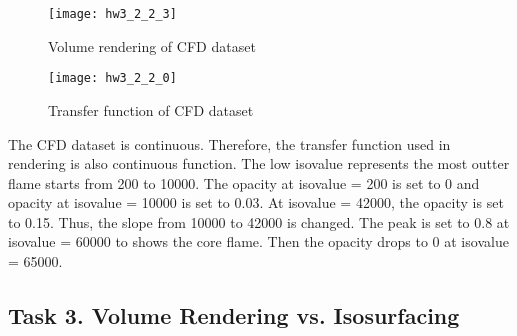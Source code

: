 \documentclass[11pt]{article}
\begin{document}
\begin{figure}[H]
\centering
\texttt{[image: hw3\_2\_2\_3]}
\caption{Volume rendering of CFD dataset}
\label{fig:hw3_2_2_3}
\end{figure}

\begin{figure}[H]
\centering
\texttt{[image: hw3\_2\_2\_0]}
\caption{Transfer function of CFD dataset}
\label{fig:hw3_2_2_0}
\end{figure}

The CFD dataset is continuous. Therefore, the transfer function used in rendering is also continuous function. The low isovalue represents the most outter flame starts from 200 to 10000.
The opacity at isovalue = 200 is set to 0 and opacity at isovalue = 10000 is set to 0.03. At isovalue  = 42000, the opacity is set to 0.15. Thus, the slope from 10000 to 42000 is changed.
The peak is set to 0.8 at isovalue = 60000 to shows the core flame. Then the opacity drops to 0 at isovalue = 65000.

\subsection*{Task 3. Volume Rendering vs. Isosurfacing}
\end{document}
